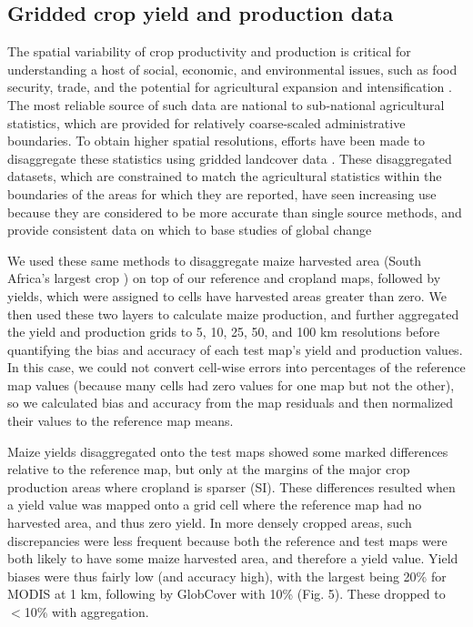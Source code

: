 \documentclass{pnastwo}
\begin{document}
\begin{article}
\subsection{Gridded crop yield and production data}
The spatial variability of crop productivity and production is critical for understanding a host of social, economic, and environmental issues, such as food security, trade, and the potential for agricultural expansion and intensification \cite{licker_mind_2010,monfreda_farming_2008}. The most reliable source of such data are national to sub-national agricultural statistics, which are provided for relatively coarse-scaled administrative boundaries. To obtain higher spatial resolutions, efforts have been made to disaggregate these statistics using gridded landcover data \cite{ramankutty_farming_2008,monfreda_farming_2008}. These disaggregated datasets, which are constrained to match the agricultural statistics within the boundaries of the areas for which they are reported, have seen increasing use because they are considered to be more accurate than single source methods, and provide consistent data on which to base studies of global change \cite{ramankutty_farming_2008, see_improved_2015}

We used these same methods  \cite{ramankutty_farming_2008,monfreda_farming_2008} to disaggregate maize harvested area (South Africa's largest crop \cite{estes_projected_2013}) on top of our reference and cropland maps, followed by yields, which were assigned to cells have harvested areas greater than zero. We then used these two layers to calculate maize production, and further aggregated the yield and production grids to 5, 10, 25, 50, and 100 km resolutions before quantifying the bias and accuracy of each test map's yield and production values. In this case, we could not convert cell-wise errors into percentages of the reference map values (because many cells had zero values for one map but not the other), so we calculated bias and accuracy from the map residuals and then normalized their values to the reference map means. 

Maize yields disaggregated onto the test maps showed some marked differences relative to the reference map, but only at the margins of the major crop production areas where cropland is sparser (SI). These differences resulted when a yield value was mapped onto a grid cell where the reference map had no harvested area, and thus zero yield. In more densely cropped areas, such discrepancies were less frequent because both the reference and test maps were both likely to have some maize harvested area, and therefore a yield value.  Yield biases were thus fairly low (and accuracy high), with the largest being 20\% for MODIS at 1 km, following by GlobCover with 10\% (Fig. 5). These dropped to $<$10\% with aggregation.  


\end{article}
\end{document}
